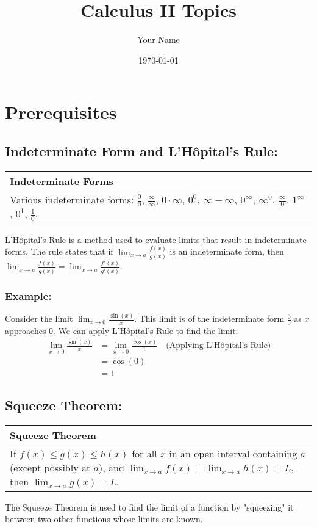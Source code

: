 \documentclass[12pt]{article}
\title{Calculus II Topics}
\author{Your Name}
\date{\today}
\newcommand{\formula}[2]{
    {\renewcommand{\arraystretch}{2}
        \begin{center}
        \begin{tabular}{|p{0.9\textwidth}|}
        \hline
        \textbf{#1} \\
        \hline
        #2 \\
        \hline
        \end{tabular}
        \end{center}
    }
}
\begin{document}
\setlength{\jot}{10pt}

\begin{titlepage}
\maketitle
\thispagestyle{empty}
\end{titlepage}

\tableofcontents
\newpage

\section{Prerequisites}

\subsection{Indeterminate Form and  L'Hôpital's Rule: }
\formula{Indeterminate Forms}{
    Various indeterminate forms: $\frac{0}{0}$, $\frac{\infty}{\infty}$, $0 \cdot \infty$, $0^0$, $\infty - \infty$, $0^{\infty}$, $\infty^0$, $\frac{\infty}{0}$, $1^{\infty}$, $0^1$, $\frac{1}{0}$.
}
L'Hôpital's Rule is a method used to evaluate limits that result in indeterminate forms. The rule states that if $\lim_{x \to a} \frac{f(x)}{g(x)}$ is an indeterminate form, then $\lim_{x \to a} \frac{f(x)}{g(x)} = \lim_{x \to a} \frac{f'(x)}{g'(x)}$.
\subsubsection{Example:}
Consider the limit $\lim_{x \to 0} \frac{\sin(x)}{x}$. This limit is of the indeterminate form $\frac{0}{0}$ as $x$ approaches $0$. We can apply L'Hôpital's Rule to find the limit:
\[
\begin{aligned}
    \lim_{x \to 0} \frac{\sin(x)}{x} &= \lim_{x \to 0} \frac{\cos(x)}{1} \quad \text{(Applying L'Hôpital's Rule)} \\
    &= \cos(0) \\
    &= 1.
\end{aligned}
\]

\vspace{\baselineskip}

\subsection{Squeeze Theorem: }
\formula{Squeeze Theorem}{
    If $f(x) \leq g(x) \leq h(x)$ for all $x$ in an open interval containing $a$ (except possibly at $a$), and $\lim_{x \to a} f(x) = \lim_{x \to a} h(x) = L$, then $\lim_{x \to a} g(x) = L$.
}
The Squeeze Theorem is used to find the limit of a function by "squeezing" it between two other functions whose limits are known.
\end{document}
